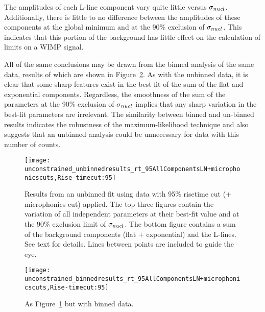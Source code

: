 The amplitudes of each L-line component vary quite little versus $\sigma_{nucl}$.  Additionally, there is little to no difference between the amplitudes of these components at the global minimum and at the 90\% exclusion of $\sigma_{nucl}$.  This indicates that this portion of the background has little effect on the calculation of limits on a WIMP signal.

All of the same conclusions may be drawn from the binned analysis of the same data, results of which are shown in Figure~\ref{fig:BinnedResultsNoConstrain}.  As with the unbinned data, it is clear that some sharp features exist in the best fit of the sum of the flat and exponential components.  Regardless, the smoothness of the sum of the parameters at the 90\% exclusion of $\sigma_{nucl}$ implies that any sharp variation in the best-fit parameters are irrelevant.  The similarity between binned and un-binned results indicates the robustness of the maximum-likelihood technique and also suggests that an unbinned analysis could be unnecessary for data with this number of counts.
  
			\begin{figure}
				\centering				
				\texttt{[image: unconstrained\_unbinnedresults\_rt\_95AllComponentsLN+microphonicscuts,Rise-timecut:95]}				
				
				\caption[Fit results using unbinned data with 95\% risetime cut (+ microphonics cut) applied]
				{Results from an unbinned fit using data with 95\% risetime cut (+ microphonics cut) applied.
				The top three figures contain the variation of all independent parameters at their best-fit value and at the 90\% exclusion
				limit of $\sigma_{nucl}$.  The bottom figure contains a sum of the background components (flat + exponential) and
				the L-lines.  See text for details.  Lines between points are included to guide the eye.}
				\label{fig:UnbinnedResultsNoConstrain}
			\end{figure}
			\begin{figure}
				\centering				
				\texttt{[image: unconstrained\_binnedresults\_rt\_95AllComponentsLN+microphonicscuts,Rise-timecut:95]}				
				
				\caption[Fit results using binned data with 95\% risetime cut (+ microphonics cut) applied]
				{As Figure~\ref{fig:UnbinnedResultsNoConstrain} but with binned data.}
				\label{fig:BinnedResultsNoConstrain}
			\end{figure}
			
